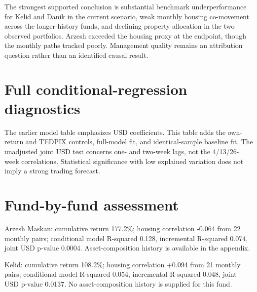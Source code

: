 \documentclass[11pt,a4paper]{article}
\begin{document}
The strongest supported conclusion is substantial benchmark underperformance for Kelid and Danik in the current scenario, weak monthly housing co-movement across the longer-history funds, and declining property allocation in the two observed portfolios. Arzesh exceeded the housing proxy at the endpoint, though the monthly paths tracked poorly. Management quality remains an attribution question rather than an identified causal result.

\section{Full conditional-regression diagnostics}

The earlier model table emphasizes USD coefficients. This table adds the own-return and TEDPIX controls, full-model fit, and identical-sample baseline fit. The unadjusted joint USD test concerns one- and two-week lags, not the 4/13/26-week correlations. Statistical significance with low explained variation does not imply a strong trading forecast.

\begin{center}
\small
{}
\end{center}

\section{Fund-by-fund assessment}

Arzesh Maskan: cumulative return 177.2\%; housing correlation -0.064 from 22 monthly pairs; conditional model R-squared 0.128, incremental R-squared 0.074, joint USD p-value 0.0004. Asset-composition history is available in the appendix.

Kelid: cumulative return 108.2\%; housing correlation +0.094 from 21 monthly pairs; conditional model R-squared 0.054, incremental R-squared 0.048, joint USD p-value 0.0137. No asset-composition history is supplied for this fund.
\end{document}
